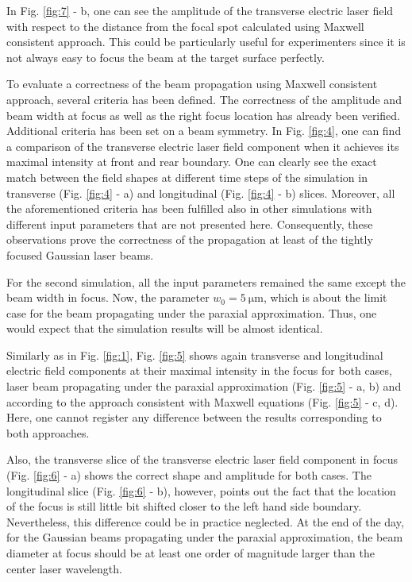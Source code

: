 In Fig. \ref{fig:7} - b, one can see the amplitude of the transverse electric laser field with respect to the distance from the focal spot calculated using Maxwell consistent approach. This could be particularly useful for experimenters since it is not always easy to focus the beam at the target surface perfectly. 

To evaluate a correctness of the beam propagation using Maxwell consistent approach, several criteria has been defined. The correctness of the amplitude and beam width at focus as well as the right focus location has already been verified. Additional criteria has been set on a beam symmetry. In Fig. \ref{fig:4}, one can find a comparison of the transverse electric laser field component when it achieves its maximal intensity at front and rear boundary. One can clearly see the exact match between the field shapes at different time steps of the simulation in transverse (Fig. \ref{fig:4} - a) and longitudinal (Fig. \ref{fig:4} - b) slices. Moreover, all the aforementioned criteria has been fulfilled also in other simulations with different input parameters that are not presented here. Consequently, these observations prove the correctness of the propagation at least of the tightly focused Gaussian laser beams.

For the second simulation, all the input parameters remained the same except the beam width in focus. Now, the parameter $ w_0 = 5 \: \mathrm{\mu m} $, which is about the limit case for the beam propagating under the paraxial approximation. Thus, one would expect that the simulation results will be almost identical.

Similarly as in Fig. \ref{fig:1}, Fig. \ref{fig:5} shows again transverse and longitudinal electric field components at their maximal intensity in the focus for both cases, laser beam propagating under the paraxial approximation (Fig. \ref{fig:5} - a, b) and according to the approach consistent with Maxwell equations (Fig. \ref{fig:5} - c, d). Here, one cannot register any difference between the results corresponding to both approaches.

Also, the transverse slice of the transverse electric laser field component in focus (Fig. \ref{fig:6} - a) shows the correct shape and amplitude for both cases. The longitudinal slice (Fig. \ref{fig:6} - b), however, points out the fact that the location of the focus is still little bit shifted closer to the left hand side boundary. Nevertheless, this difference could be in practice neglected. At the end of the day, for the Gaussian beams propagating under the paraxial approximation, the beam diameter at focus should be at least one order of magnitude larger than the center laser wavelength.

